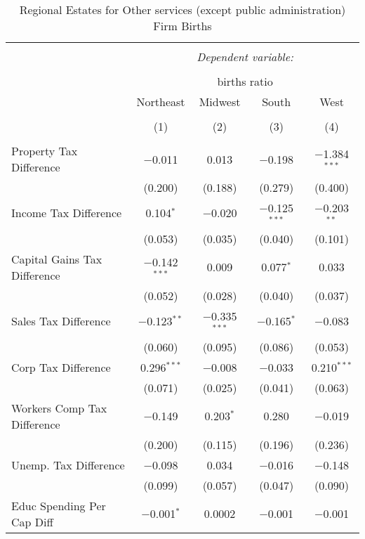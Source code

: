 
\begin{table}[!htbp] \centering 
  \caption{Regional Estates for  Other services (except public administration) Firm Births} 
  \label{} 
\begin{tabular}{@{\extracolsep{5pt}}lcccc} 
\\[-1.8ex]\hline 
\hline \\[-1.8ex] 
 & \multicolumn{4}{c}{\textit{Dependent variable:}} \\ 
\cline{2-5} 
\\[-1.8ex] & \multicolumn{4}{c}{births ratio} \\ 
 & Northeast & Midwest & South & West \\ 
\\[-1.8ex] & (1) & (2) & (3) & (4)\\ 
\hline \\[-1.8ex] 
 Property Tax Difference & $-$0.011 & 0.013 & $-$0.198 & $-$1.384$^{***}$ \\ 
  & (0.200) & (0.188) & (0.279) & (0.400) \\ 
  Income Tax Difference & 0.104$^{*}$ & $-$0.020 & $-$0.125$^{***}$ & $-$0.203$^{**}$ \\ 
  & (0.053) & (0.035) & (0.040) & (0.101) \\ 
  Capital Gains Tax Difference & $-$0.142$^{***}$ & 0.009 & 0.077$^{*}$ & 0.033 \\ 
  & (0.052) & (0.028) & (0.040) & (0.037) \\ 
  Sales Tax Difference & $-$0.123$^{**}$ & $-$0.335$^{***}$ & $-$0.165$^{*}$ & $-$0.083 \\ 
  & (0.060) & (0.095) & (0.086) & (0.053) \\ 
  Corp Tax Difference & 0.296$^{***}$ & $-$0.008 & $-$0.033 & 0.210$^{***}$ \\ 
  & (0.071) & (0.025) & (0.041) & (0.063) \\ 
  Workers Comp Tax Difference & $-$0.149 & 0.203$^{*}$ & 0.280 & $-$0.019 \\ 
  & (0.200) & (0.115) & (0.196) & (0.236) \\ 
  Unemp. Tax Difference & $-$0.098 & 0.034 & $-$0.016 & $-$0.148 \\ 
  & (0.099) & (0.057) & (0.047) & (0.090) \\ 
  Educ Spending Per Cap Diff & $-$0.001$^{*}$ & 0.0002 & $-$0.001 & $-$0.001 \\ 

\end{tabular}
\end{table}

